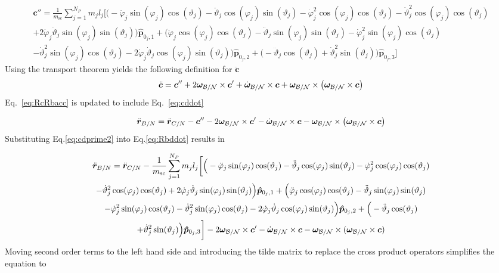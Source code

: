 \begin{multline}
	\bm{c}'' = \frac{1}{m_{\text{sc}}}\sum_{j=1}^{N_{P}}m_j l_j \bigg[
	\Big(-\ddot{\varphi}_j\sin(\varphi_j)\cos(\vartheta_j)-\ddot{\vartheta}_j\cos(\varphi_j)\sin(\vartheta_j)-\dot{\varphi}_j^2\cos(\varphi_j)\cos(\vartheta_j)-\dot{\vartheta}_j^2\cos(\varphi_j)\cos(\vartheta_j)\\+2\dot{\varphi}_j\dot{\vartheta}_j\sin(\varphi_j)\sin(\vartheta_j) \Big)\bm{\hat{p}}_{0_j,1}
	+\Big(\ddot{\varphi}_j\cos(\varphi_j)\cos(\vartheta_j)-\ddot{\vartheta}_j\sin(\varphi_j)\sin(\vartheta_j)-\dot{\varphi}_j^2\sin(\varphi_j)\cos(\vartheta_j)\\-\dot{\vartheta}_j^2\sin(\varphi_j)\cos(\vartheta_j)-2\dot{\varphi}_j\dot{\vartheta}_j\cos(\varphi_j)\sin(\vartheta_j) \Big)\bm{\hat{p}}_{0_j,2}
	+\Big(-\ddot{\vartheta}_j\cos(\vartheta_j)+\dot{\vartheta}_j^2\sin(\vartheta_j) \Big)\bm{\hat{p}}_{0_j,3}
	\bigg]
	\label{eq:cdprime2}
\end{multline}
Using the transport theorem yields the following definition for $\ddot{\bm c}$
\begin{equation}
	\ddot{\bm c} = \bm{c}'' + 2\bm\omega_{\cal B/N}\times\bm{c}'+\dot{\bm\omega}_{\cal B/N}\times\bm{c}+\bm\omega_{\cal B/N}\times\left(\bm\omega_{\cal B/N}\times\bm{c}\right)
	\label{eq:cddot}
\end{equation}
Eq.~\eqref{eq:RcRbacc} is updated to include Eq.~\eqref{eq:cddot}

\begin{equation}
	\ddot{\bm r}_{B/N} = \ddot{\bm r}_{C/N}-\bm{c}'' - 2\bm\omega_{\cal B/N}\times\bm{c}'-\dot{\bm\omega}_{\cal B/N}\times\bm{c}-\bm\omega_{\cal B/N}\times\left(\bm\omega_{\cal B/N}\times\bm{c}\right)
	\label{eq:Rbddot}
\end{equation}
Substituting Eq.\eqref{eq:cdprime2} into Eq.\eqref{eq:Rbddot} results in

\begin{multline}
	\ddot{\bm r}_{B/N} = \ddot{\bm r}_{C/N}-\frac{1}{m_{\text{sc}}}\sum_{j=1}^{N_{P}}m_j l_j \bigg[
	\Big(-\ddot{\varphi}_j\sin(\varphi_j)\cos(\vartheta_j)-\ddot{\vartheta}_j\cos(\varphi_j)\sin(\vartheta_j)-\dot{\varphi}_j^2\cos(\varphi_j)\cos(\vartheta_j)\\-\dot{\vartheta}_j^2\cos(\varphi_j)\cos(\vartheta_j)+2\dot{\varphi}_j\dot{\vartheta}_j\sin(\varphi_j)\sin(\vartheta_j) \Big)\bm{\hat{p}}_{0_j,1}
	+\Big(\ddot{\varphi}_j\cos(\varphi_j)\cos(\vartheta_j)-\ddot{\vartheta}_j\sin(\varphi_j)\sin(\vartheta_j)\\-\dot{\varphi}_j^2\sin(\varphi_j)\cos(\vartheta_j)-\dot{\vartheta}_j^2\sin(\varphi_j)\cos(\vartheta_j)-2\dot{\varphi}_j\dot{\vartheta}_j\cos(\varphi_j)\sin(\vartheta_j) \Big)\bm{\hat{p}}_{0_j,2}
	+\Big(-\ddot{\vartheta}_j\cos(\vartheta_j)\\+\dot{\vartheta}_j^2\sin(\vartheta_j) \Big)\bm{\hat{p}}_{0_j,3}
	\bigg]
	- 2\bm\omega_{\cal B/N}\times\bm c'
	-\dot{\bm\omega}_{\cal B/N}\times\bm{c}-\bm\omega_{\cal B/N}\times(\bm\omega_{\cal B/N}\times\bm{c})
	\label{eq:Rbddot2}
\end{multline}
Moving second order terms to the left hand side and introducing the tilde matrix to replace the cross product operators simplifies the equation to

